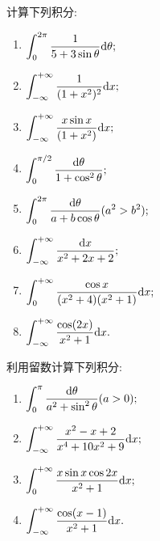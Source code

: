 \begin{yyEx}
	计算下列积分:
	\begin{enumerate}
		\item $\begin{lgathered}
		\int_{0}^{2\pi}\frac{1}{5+3\sin\theta}\mathrm{d}\theta;
		\end{lgathered}$
		\item $\begin{lgathered}
		\int_{-\infty}^{+\infty}\frac{1}{(1+x^2)^2}\mathrm{d}x;
		\end{lgathered}$
		\item $\begin{lgathered}
		\int_{-\infty}^{+\infty}\frac{x\sin x}{(1+x^2)}\mathrm{d}x;
		\end{lgathered}$
		\item $\begin{lgathered}
		\int_{0}^{\pi/2}\frac{\mathrm{d}\theta}{1+\cos^2\theta};
		\end{lgathered}$
		\item $\begin{lgathered}
		\int_{0}^{2\pi}\frac{\mathrm{d}\theta}{a+b\cos\theta}(a^2>b^2);
		\end{lgathered}$
		\item $\begin{lgathered}
		\int_{-\infty}^{+\infty}\frac{\mathrm{d}x}{x^2+2x+2};
		\end{lgathered}$
		\item $\begin{lgathered}
		\int_{0}^{+\infty}\frac{\cos x}{(x^2+4)(x^2+1)}\mathrm{d}x;
		\end{lgathered}$
		\item $\begin{lgathered}
		\int_{-\infty}^{+\infty}\frac{\cos(2x)}{x^2+1}\mathrm{d}x.
		\end{lgathered}$
	\end{enumerate}
\end{yyEx}

\begin{yyEx}
	利用留数计算下列积分:
	\begin{enumerate}
		\item $\begin{lgathered}
			\int_{0}^{\pi}\frac{\mathrm{d}\theta}{a^2+\sin^2\theta}(a>0);
		\end{lgathered}$
		\item $\begin{lgathered}
		\int_{-\infty}^{+\infty}\frac{x^2-x+2}{x^4+10x^2+9}\mathrm{d}x;
		\end{lgathered}$
		\item $\begin{lgathered}
		\int_{0}^{+\infty}\frac{x\sin x\cos 2x}{x^2+1}\mathrm{d}x;
		\end{lgathered}$
		\item $\begin{lgathered}
		\int_{-\infty}^{+\infty}\frac{\cos(x-1)}{x^2+1}\mathrm{d}x.
		\end{lgathered}$
	\end{enumerate}
\end{yyEx}

